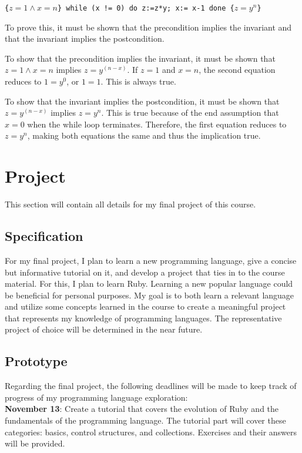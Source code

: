 \documentclass{article}
\theoremstyle{theorem}
\theoremstyle{definition}
\theoremstyle{remark}
\begin{document}
\texttt{\{$z=1 \land x=n$\}  while (x != 0) do z:=z*y;  x:= x-1 done  \{$z = y^n$\}}

To prove this, it must be shown that the precondition implies the invariant and that the invariant implies the postcondition.

To show that the precondition implies the invariant, it must be shown that $z=1 \land x=n$ implies $z = y^{(n - x)}$. If $z=1$ and $x=n$, the second equation reduces to $1=y^0$, or $1=1$. This is always true.

To show that the invariant implies the postcondition, it must be shown that $z = y^{(n - x)}$ implies $z = y^n$. This is true because of the end assumption that $x=0$ when the while loop terminates. Therefore, the first equation reduces to $z = y^n$, making both equations the same and thus the implication true.


\section{Project}
This section will contain all details for my final project of this course.
\subsection{Specification}
For my final project, I plan to learn a new programming language, give a concise but informative tutorial on it, and develop a project that ties in to the course material. For this, I plan to learn Ruby. Learning a new popular language could be beneficial for personal purposes. My goal is to both learn a relevant language and utilize some concepts learned in the course to create a meaningful project that represents my knowledge of programming languages. The representative project of choice will be determined in the near future.
\subsection{Prototype}
Regarding the final project, the following deadlines will be made to keep track of progress of my programming language exploration:\\

\noindent \textbf{November 13}: Create a tutorial that covers the evolution of Ruby and the fundamentals of the programming language. The tutorial part will cover these categories: basics, control structures, and collections. Exercises and their answers will be provided.\\
\end{document}
